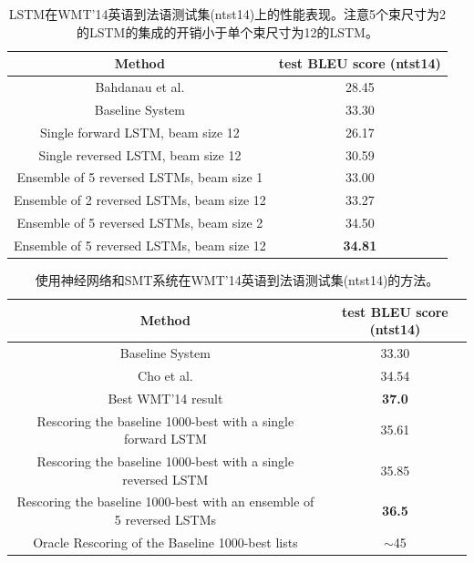 \begin{table}[t]
	\centering
	\begin{small}
		\begin{tabular}{|c|c|}
			\hline
			{\bf Method}  & {\bf test BLEU score (ntst14) } \\ \hline
			Bahdanau et al. \cite{bog14}  &  28.45 \\ \hline
			Baseline System  \cite{wmt14_en_fr} & 33.30 \\ \hline
			\hline
			Single forward LSTM, beam size 12 & 26.17 \\ \hline                 
			Single reversed LSTM, beam size 12 & 30.59 \\ \hline
			Ensemble of 5 reversed LSTMs, beam size 1  &  33.00 \\ \hline
			Ensemble of 2 reversed LSTMs, beam size 12  &  33.27 \\ \hline
			Ensemble of 5 reversed LSTMs, beam size 2  &  34.50 \\ \hline
			Ensemble of 5 reversed LSTMs, beam size 12  &  {\bf 34.81} \\ \hline
		\end{tabular}
	\end{small}
	\caption{LSTM在WMT'14英语到法语测试集(ntst14)上的性能表现。注意5个束尺寸为2的LSTM的集成的开销小于单个束尺寸为12的LSTM。}
	\label{tab:blue_fr}
\end{table}

\begin{table}[]
	\centering
	\begin{small}
		\begin{tabular}{|c|c|}
			\hline
			{\bf Method}  & {\bf test BLEU score (ntst14) } \\ \hline
			Baseline System  \cite{wmt14_en_fr} & 33.30 \\ \hline
			Cho et al. \cite{cho14}  & 34.54 \\ \hline 
			Best WMT'14 result \cite{durrani-EtAl:2014:W14-33} &  {\bf 37.0} \\ \hline
			\hline
			Rescoring the baseline 1000-best with a single forward LSTM & 35.61 \\ \hline 
			Rescoring the baseline 1000-best with a single reversed  LSTM & 35.85 \\ \hline  %
			Rescoring the baseline 1000-best with an ensemble of 5 reversed LSTMs  &  {\bf 36.5} \\ \hline    %
			\hline
			Oracle Rescoring of the Baseline 1000-best lists    & $\sim$45 \\ \hline 
		\end{tabular}
	\end{small}
	\caption{使用神经网络和SMT系统在WMT'14英语到法语测试集(ntst14)的方法。}
	\label{tab:blue_fr_rescore}
\end{table}


